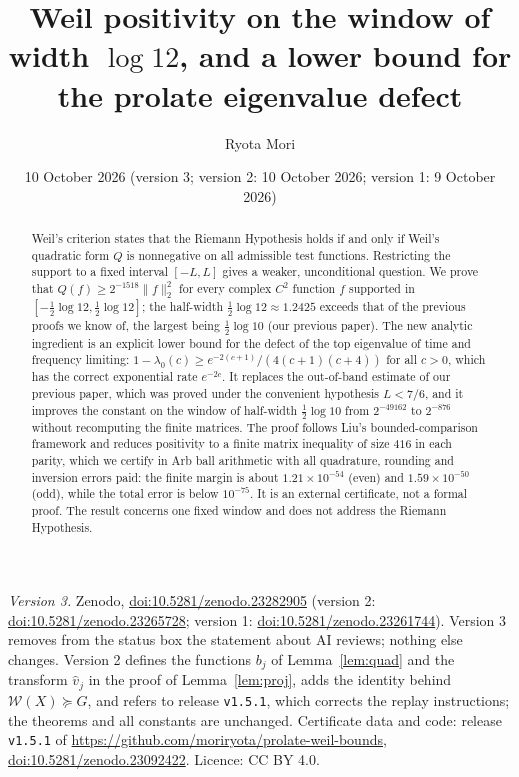 \documentclass[11pt]{amsart}
\title[Weil positivity on the window of width $\log 12$]{Weil positivity on the window of width $\log 12$, and a lower bound for the prolate eigenvalue defect}
\author{Ryota Mori}
\date{10 October 2026 (version 3; version 2: 10 October 2026; version 1: 9 October 2026)}
\newcommand{\doi}[1]{\href{https://doi.org/#1}{doi:#1}}
\theoremstyle{remark}
\numberwithin{equation}{section}
\begin{document}
\begin{abstract}
Weil's criterion states that the Riemann Hypothesis holds if and only if Weil's quadratic form $Q$ is nonnegative on all admissible test functions. Restricting the support to a fixed interval $[-L,L]$ gives a weaker, unconditional question. We prove that $Q(f)\ge2^{-1518}\|f\|_2^2$ for every complex $C^2$ function $f$ supported in $[-\tfrac12\log12,\tfrac12\log12]$; the half-width $\tfrac12\log12\approx1.2425$ exceeds that of the previous proofs we know of, the largest being $\tfrac12\log10$ (our previous paper). The new analytic ingredient is an explicit lower bound for the defect of the top eigenvalue of time and frequency limiting: $1-\lambda_0(c)\ge e^{-2(c+1)}/(4(c+1)(c+4))$ for all $c>0$, which has the correct exponential rate $e^{-2c}$. It replaces the out-of-band estimate of our previous paper, which was proved under the convenient hypothesis $L<7/6$, and it improves the constant on the window of half-width $\tfrac12\log10$ from $2^{-49162}$ to $2^{-876}$ without recomputing the finite matrices. The proof follows Liu's bounded-comparison framework and reduces positivity to a finite matrix inequality of size $416$ in each parity, which we certify in Arb ball arithmetic with all quadrature, rounding and inversion errors paid: the finite margin is about $1.21\times10^{-54}$ (even) and $1.59\times10^{-50}$ (odd), while the total error is below $10^{-75}$. It is an external certificate, not a formal proof. The result concerns one fixed window and does not address the Riemann Hypothesis.
\end{abstract}

\maketitle

\begin{sloppypar}
\noindent\textit{Version 3.} Zenodo, \doi{10.5281/zenodo.23282905} (version 2: \doi{10.5281/zenodo.23265728}; version 1: \doi{10.5281/zenodo.23261744}). Version 3 removes from the status box the statement about AI reviews; nothing else changes. Version 2 defines the functions $b_j$ of Lemma~\ref{lem:quad} and the transform $\hat v_j$ in the proof of Lemma~\ref{lem:proj}, adds the identity behind $\mathcal W(X)\succeq G$, and refers to release \texttt{v1.5.1}, which corrects the replay instructions; the theorems and all constants are unchanged. Certificate data and code: release \texttt{v1.5.1} of \url{https://github.com/moriryota/prolate-weil-bounds}, \doi{10.5281/zenodo.23092422}. Licence: CC BY 4.0.
\end{sloppypar}
\end{document}
